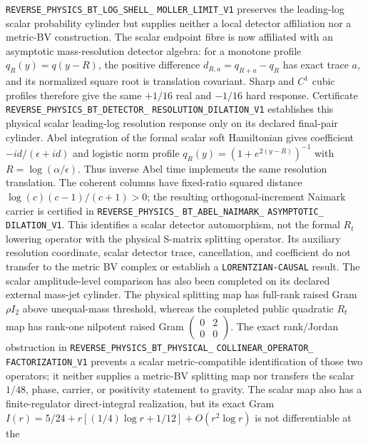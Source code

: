 \documentclass[11pt]{article}
\theoremstyle{definition}
\theoremstyle{remark}
\begin{document}
\texttt{REVERSE\_PHYSICS\_BT\_LOG\_SHELL\_}
\allowbreak\texttt{MOLLER\_LIMIT\_V1}
preserves the leading-log scalar probability cylinder but supplies neither a
local detector affiliation nor a metric-BV construction.
The scalar endpoint fibre is now affiliated with an asymptotic
mass-resolution detector algebra: for a monotone profile $q_R(y)=q(y-R)$,
the positive difference $d_{R,a}=q_{R+a}-q_R$ has exact trace $a$, and its
normalized square root is translation covariant.  Sharp and $C^1$ cubic
profiles therefore give the same $+1/16$ real and $-1/16$ hard response.
Certificate
\texttt{REVERSE\_PHYSICS\_BT\_DETECTOR\_}
\allowbreak\texttt{RESOLUTION\_DILATION\_V1}
establishes this physical scalar leading-log resolution response only on its
declared final-pair cylinder.  Abel integration of the formal scalar soft
Hamiltonian gives coefficient $-id/(\epsilon+id)$ and logistic norm profile
$q_R(y)=(1+e^{2(y-R)})^{-1}$ with $R=\log(\alpha/\epsilon)$.  Thus inverse
Abel time implements the same resolution translation.  The coherent columns
have fixed-ratio squared distance
$\log(c)(c-1)/(c+1)>0$; the resulting orthogonal-increment Naimark carrier is
certified in
\texttt{REVERSE\_PHYSICS\_}
\allowbreak\texttt{BT\_ABEL\_NAIMARK\_}
\allowbreak\texttt{ASYMPTOTIC\_}
\allowbreak\texttt{DILATION\_V1}.
This identifies a scalar detector automorphism, not the formal $R_t$ lowering
operator with the physical S-matrix splitting operator.  Its auxiliary
resolution coordinate, scalar detector trace, cancellation, and coefficient
do not transfer to the metric BV complex or establish a
\texttt{LORENTZIAN-CAUSAL} result.
The scalar amplitude-level comparison has also been completed on its declared
external mass-jet cylinder.  The physical splitting map has full-rank raised
Gram $\rho I_2$ above unequal-mass threshold, whereas the completed public
quadratic $R_t$ map has rank-one nilpotent raised Gram
$\left(\begin{smallmatrix}0&2\\0&0\end{smallmatrix}\right)$.  The exact
rank/Jordan obstruction in
\texttt{REVERSE\_PHYSICS\_BT\_PHYSICAL\_}
\allowbreak\texttt{COLLINEAR\_OPERATOR\_}
\allowbreak\texttt{FACTORIZATION\_V1}
prevents a scalar metric-compatible identification of those two operators;
it neither supplies a metric-BV splitting map nor transfers the scalar
$1/48$, phase, carrier, or positivity statement to gravity.
The scalar map also has a finite-regulator direct-integral realization, but
its exact Gram
$I(r)=5/24+r[(1/4)\log r+1/12]+O(r^2\log r)$ is not differentiable at the
\end{document}
